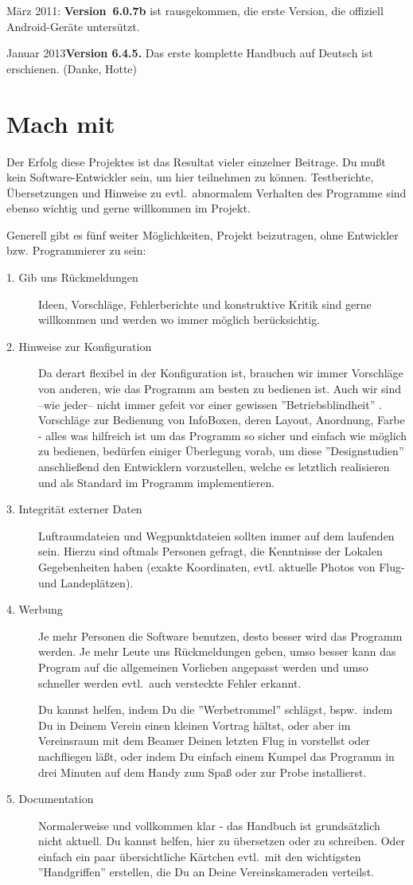 März 2011: {\bf Version~6.0.7b} ist rausgekommen, die erste Version, die offiziell  Android-Geräte untersützt.

Januar 2013{\bf Version 6.4.5.} Das erste komplette Handbuch auf Deutsch ist erschienen. (Danke, Hotte)

\section{Mach mit}

Der Erfolg diese Projektes ist das Resultat vieler einzelner Beitrage. Du mußt kein Software-Entwickler sein, um hier teilnehmen zu können.
Testberichte, Übersetzungen und Hinweise zu evtl.\ abnormalem Verhalten des Programme sind ebenso wichtig und gerne willkommen
im Projekt.

Generell gibt es fünf weiter Möglichkeiten, Projekt beizutragen, ohne Entwickler bzw. Programmierer zu sein:

\begin{description}
\item[1. Gib uns Rückmeldungen] Ideen, Vorschläge, Fehlerberichte und konstruktive Kritik sind gerne willkommen und werden
wo immer möglich berücksichtig.
\item[2. Hinweise zur Konfiguration] Da \xc derart flexibel in der Konfiguration ist, brauchen wir immer Vorschläge von anderen, wie
das Programm am besten zu bedienen ist. Auch wir sind --wie jeder-- nicht immer gefeit vor einer gewissen ''Betriebsblindheit'' .
Vorschläge zur Bedienung von InfoBoxen, deren Layout, Anordnung, Farbe - alles was hilfreich ist um das Programm so sicher
und einfach wie möglich zu bedienen, bedürfen einiger Überlegung vorab, um diese ''Designstudien'' anschließend den Entwicklern
vorzustellen, welche es letztlich realisieren und als Standard im Programm implementieren.
\item[3. Integrität externer Daten] Luftraumdateien und Wegpunktdateien sollten immer auf dem laufenden sein.
Hierzu sind oftmals Personen gefragt, die Kenntnisse der Lokalen Gegebenheiten haben (exakte Koordinaten, evtl. aktuelle Photos von Flug- und Landeplätzen).
\item[4. Werbung]  Je mehr Personen die Software benutzen, desto besser wird das Programm werden. Je mehr Leute uns Rückmeldungen geben, umso
besser kann das Program auf die allgemeinen Vorlieben angepasst werden und umso schneller werden evtl.\ auch versteckte Fehler erkannt.

Du kannst helfen, indem Du die ''Werbetrommel'' schlägst, bspw.\ indem Du in Deinem Verein einen kleinen Vortrag hältst, oder aber im Vereinsraum mit
dem Beamer Deinen letzten Flug in \xc vorstellst oder nachfliegen läßt, oder indem Du einfach einem Kumpel das Programm in drei Minuten auf 
dem Handy zum Spaß oder zur Probe installierst.
\item[5. Documentation]  Normalerweise und vollkommen klar - das Handbuch ist grundsätzlich nicht aktuell. Du kannst helfen, hier zu übersetzen oder zu 
schreiben. Oder einfach ein paar übersichtliche Kärtchen evtl.\ mit den wichtigsten ''Handgriffen'' erstellen, die Du an Deine Vereinskameraden 
verteilst.
\end{description}

